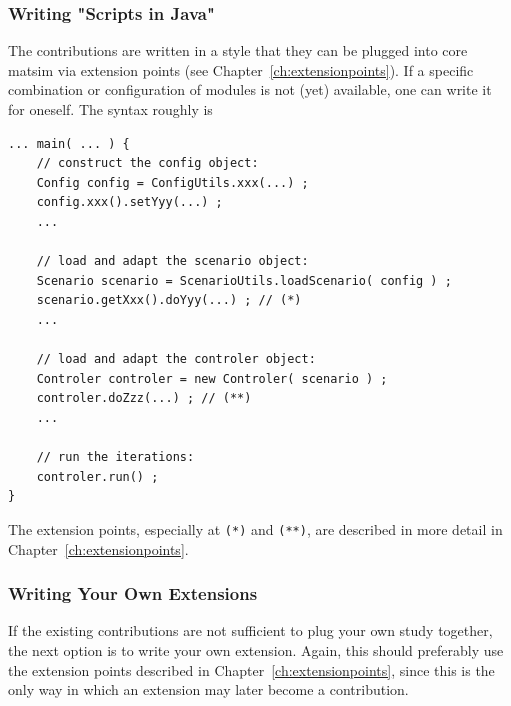 \subsubsection{Writing "Scripts in Java"}
\label{sec:writing-scripts-java}
The \glspl{contribution} are written in a style that they can be plugged into core \gls{matsim} via extension points (see Chapter~\ref{ch:extensionpoints}). If a specific combination or configuration of modules is not (yet) available, one can write it for oneself. The syntax roughly is
\begin{lstlisting}
... main( ... ) {
    // construct the config object:
    Config config = ConfigUtils.xxx(...) ;
    config.xxx().setYyy(...) ;
    ...

    // load and adapt the scenario object:
    Scenario scenario = ScenarioUtils.loadScenario( config ) ;
    scenario.getXxx().doYyy(...) ; // (*)
    ...

    // load and adapt the controler object:
    Controler controler = new Controler( scenario ) ;
    controler.doZzz(...) ; // (**)
    ...

    // run the iterations:
    controler.run() ;
}
\end{lstlisting}
The extension points, especially at \lstinline{(*)} and \lstinline{(**)}, are described in more detail in Chapter~\ref{ch:extensionpoints}.

\subsubsection{Writing Your Own Extensions}
\label{sec:writing-your-own-extensions}
If the existing \glspl{contribution} are not sufficient to plug your own study together, the next option is to write your own \gls{extension}.  Again, this should preferably use the extension points described in Chapter~\ref{ch:extensionpoints}, since this is the only way in which an \gls{extension} may later become a \gls{contribution}.  


